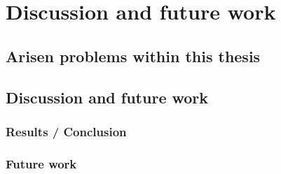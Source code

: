\chapter[Discussion and future work]{Discussion and future work}
\section{Arisen problems within this thesis}

\section{Discussion and future work}
\subsection{Results / Conclusion}


\subsection{Future work}

